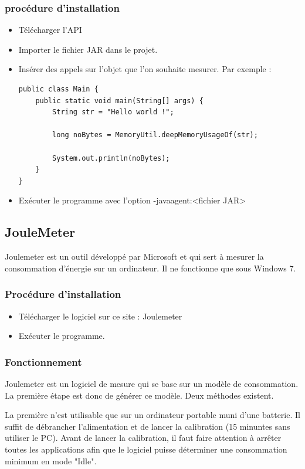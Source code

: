 \documentclass[a4paper, 11pt]{report}
\begin{document}
\subsubsection{procédure d'installation}
\begin{itemize}
	\item Télécharger l’API
	\item Importer le fichier JAR dans le projet.
	\item Insérer des appels sur l’objet que l’on souhaite mesurer. Par exemple :
\begin{verbatim}
public class Main {
	public static void main(String[] args) {
		String str = "Hello world !";
		
		long noBytes = MemoryUtil.deepMemoryUsageOf(str);
		
		System.out.println(noBytes);
	}
}
\end{verbatim}
	\item Exécuter le programme avec l’option -javaagent:<fichier JAR>
\end{itemize}

\subsection{JouleMeter}
Joulemeter est un outil développé par Microsoft et qui sert à mesurer la consommation d’énergie sur un ordinateur. Il ne fonctionne que sous Windows 7.

\subsubsection{Procédure d'installation}
\begin{itemize}
	\item Télécharger le logiciel sur ce site : Joulemeter
	\item Exécuter le programme.
\end{itemize}

\subsubsection{Fonctionnement}
Joulemeter est un logiciel de mesure qui se base sur un modèle de consommation. La première étape est donc de générer ce modèle. Deux méthodes existent.

La première n’est utilisable que sur un ordinateur portable muni d’une batterie. Il suffit de débrancher l’alimentation et de lancer la calibration (15 minuntes sans utiliser le PC). Avant de lancer la calibration, il faut faire attention à arrêter toutes les applications afin que le logiciel puisse déterminer une consommation minimum en mode "Idle".
\end{document}
